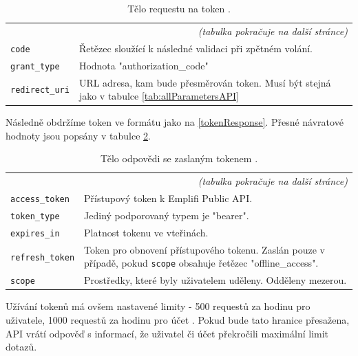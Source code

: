 \documentclass[czech, bc, kiv, he, iso690numb]{fasthesis}
\begin{document}
\begin{center}
	\begin{longtable}{p{}p{}}
	\caption{Tělo requestu na token \cite{emplifiDocs}.}
	\label{tab:exampleRequestBody}\\
	\toprule[1.5pt]
	\endhead
	\midrule
	\multicolumn{2}{r}{\textit{(tabulka pokračuje na další stránce)}}\\
	\endfoot
	\bottomrule[1.5pt]
	\endlastfoot
	\verb"code" & Řetězec sloužící k následné validaci při zpětném volání. \\
	\midrule
	\verb"grant_type" & Hodnota "authorization\_code" \\
	\midrule
	\verb"redirect_uri" & URL adresa, kam bude přesměrován token. Musí být stejná jako v tabulce \ref{tab:allParametersAPI} \\
	\end{longtable}
\end{center}

Následně obdržíme token ve formátu jako na \ref{tokenResponse}. Přesné návratové hodnoty jsou popsány v tabulce \ref{tab:exampleRequestResponse}.

\begin{center}
	\begin{longtable}{p{}p{}}
	\caption{Tělo odpovědi se zaslaným tokenem \cite{emplifiDocs}.}
	\label{tab:exampleRequestResponse}\\
	\toprule[1.5pt]
	\endhead
	\midrule
	\multicolumn{2}{r}{\textit{(tabulka pokračuje na další stránce)}}\\
	\endfoot
	\bottomrule[1.5pt]
	\endlastfoot
	\verb"access_token" & Přístupový token k Emplifi Public API. \\
	\midrule
	\verb"token_type" & Jediný podporovaný typem je "bearer". \\
	\midrule
	\verb"expires_in" & Platnost tokenu ve vteřinách. \\
	\midrule
	\verb"refresh_token" & Token pro obnovení přístupového tokenu. Zaslán pouze v případě, pokud \verb"scope" obsahuje řetězec "offline\_access".\\
	\midrule
	\verb"scope" & Prostředky, které byly uživatelem uděleny. Odděleny mezerou. \\
	\end{longtable}
\end{center}



Užívání tokenů má ovšem nastavené limity - 500 requestů za hodinu pro uživatele, 1000 requestů za hodinu pro účet \cite{emplifiDocs}. Pokud bude tato hranice přesažena,
API vrátí odpověď s informací, že uživatel či účet překročili maximální limit dotazů.
\end{document}
